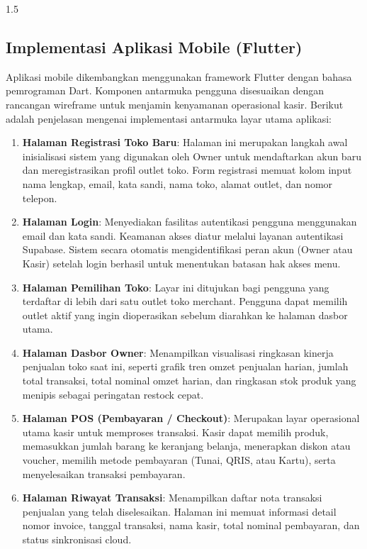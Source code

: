\documentclass[12pt, a4paper, onecolumn, oneside]{report}
\begin{document}
\begin{spacing}{1.5}
\subsection{Implementasi Aplikasi Mobile (Flutter)}

Aplikasi mobile dikembangkan menggunakan framework Flutter dengan bahasa pemrograman Dart. Komponen antarmuka pengguna disesuaikan dengan rancangan wireframe untuk menjamin kenyamanan operasional kasir. Berikut adalah penjelasan mengenai implementasi antarmuka layar utama aplikasi:

\begin{enumerate}
    \item \textbf{Halaman Registrasi Toko Baru}:
    Halaman ini merupakan langkah awal inisialisasi sistem yang digunakan oleh Owner untuk mendaftarkan akun baru dan meregistrasikan profil outlet toko. Form registrasi memuat kolom input nama lengkap, email, kata sandi, nama toko, alamat outlet, dan nomor telepon.
    
    \item \textbf{Halaman Login}:
    Menyediakan fasilitas autentikasi pengguna menggunakan email dan kata sandi. Keamanan akses diatur melalui layanan autentikasi Supabase. Sistem secara otomatis mengidentifikasi peran akun (Owner atau Kasir) setelah login berhasil untuk menentukan batasan hak akses menu.
    
    \item \textbf{Halaman Pemilihan Toko}:
    Layar ini ditujukan bagi pengguna yang terdaftar di lebih dari satu outlet toko merchant. Pengguna dapat memilih outlet aktif yang ingin dioperasikan sebelum diarahkan ke halaman dasbor utama.
    
    \item \textbf{Halaman Dasbor Owner}:
    Menampilkan visualisasi ringkasan kinerja penjualan toko saat ini, seperti grafik tren omzet penjualan harian, jumlah total transaksi, total nominal omzet harian, dan ringkasan stok produk yang menipis sebagai peringatan restock cepat.
    
    \item \textbf{Halaman POS (Pembayaran / Checkout)}:
    Merupakan layar operasional utama kasir untuk memproses transaksi. Kasir dapat memilih produk, memasukkan jumlah barang ke keranjang belanja, menerapkan diskon atau voucher, memilih metode pembayaran (Tunai, QRIS, atau Kartu), serta menyelesaikan transaksi pembayaran.
    
    \item \textbf{Halaman Riwayat Transaksi}:
    Menampilkan daftar nota transaksi penjualan yang telah diselesaikan. Halaman ini memuat informasi detail nomor invoice, tanggal transaksi, nama kasir, total nominal pembayaran, dan status sinkronisasi cloud.
    

\end{enumerate}
\end{spacing}
\end{document}
